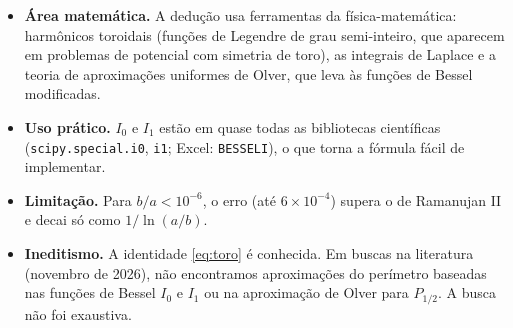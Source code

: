\documentclass[11pt,a4paper]{article}
\theoremstyle{remark}
\begin{document}
\begin{itemize}
\item \textbf{Área matemática.} A dedução usa ferramentas da física-matemática: harmônicos toroidais
(funções de Legendre de grau semi-inteiro, que aparecem em problemas de potencial
com simetria de toro), as integrais de Laplace e a teoria de aproximações uniformes de Olver,
que leva às funções de Bessel modificadas.
\item \textbf{Uso prático.} $I_0$ e $I_1$ estão em quase todas as bibliotecas
científicas (\texttt{scipy.special.i0}, \texttt{i1}; Excel: \texttt{BESSELI}), o que
torna a fórmula fácil de implementar.
\item \textbf{Limitação.} Para $b/a<10^{-6}$, o erro (até $6\times10^{-4}$) supera o de
Ramanujan II e decai só como $1/\ln(a/b)$.
\item \textbf{Ineditismo.} A identidade \eqref{eq:toro} é conhecida. Em buscas na
literatura (novembro de 2026), não encontramos aproximações do perímetro baseadas
nas funções de Bessel $I_0$ e $I_1$ ou na aproximação de Olver para $P_{1/2}$. A busca não foi
exaustiva.
\end{itemize}
\end{document}
